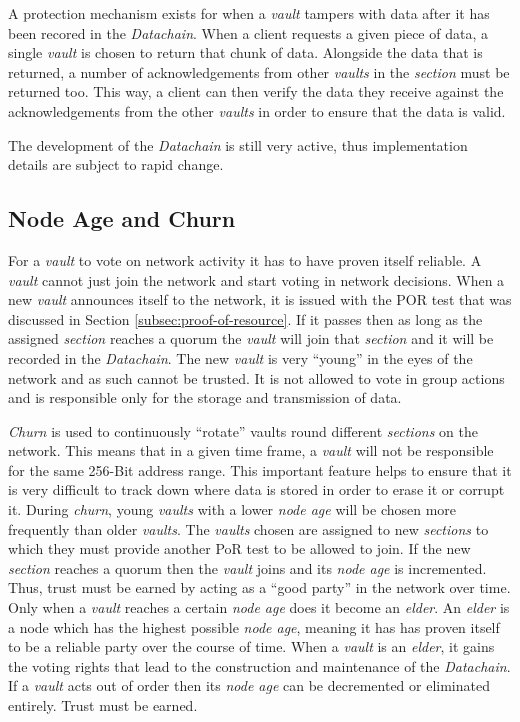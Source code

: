 A protection mechanism exists for when a \textit{vault} tampers with data after it has been recored in the \textit{Datachain}. When a client requests a given piece of data, a single \textit{vault} is chosen to return that chunk of data. Alongside the data that is returned, a number of acknowledgements from other \textit{vaults} in the \textit{section} must be returned too. This way, a client can then verify the data they receive against the acknowledgements from the other \textit{vaults} in order to ensure that the data is valid.

The development of the \textit{Datachain} is still very active, thus implementation details are subject to rapid change.

\subsection{Node Age and Churn}

For a \textit{vault} to vote on network activity it has to have proven itself reliable. A \textit{vault} cannot just join the network and start voting in network decisions. When a new \textit{vault} announces itself to the network, it is issued with the POR test that was discussed in Section \ref{subsec:proof-of-resource}. If it passes then as long as the assigned \textit{section} reaches a quorum the \textit{vault} will join that \textit{section} and it will be recorded in the \textit{Datachain}. The new \textit{vault} is very ``young'' in the eyes of the network and as such cannot be trusted. It is not allowed to vote in group actions and is responsible only for the storage and transmission of data.

\textit{Churn} is used to continuously ``rotate'' vaults round different \textit{sections} on the network. This means that in a given time frame, a \textit{vault} will not be responsible for the same 256-Bit address range. This important feature helps to ensure that it is very difficult to track down where data is stored in order to erase it or corrupt it. During \textit{churn}, young \textit{vaults} with a lower \textit{node age} will be chosen more frequently than older \textit{vaults}. The \textit{vaults} chosen are assigned to new \textit{sections} to which they must provide another PoR test to be allowed to join. If the new \textit{section} reaches a quorum then the \textit{vault} joins and its \textit{node age} is incremented. Thus, trust must be earned by acting as a ``good party'' in the network over time. Only when a \textit{vault} reaches a certain \textit{node age} does it become an \textit{elder}. An \textit{elder} is a node which has the highest possible \textit{node age}, meaning it has has proven itself to be a reliable party over the course of time. When a \textit{vault} is an \textit{elder}, it gains the voting rights that lead to the construction and maintenance of the \textit{Datachain}. If a \textit{vault} acts out of order then its \textit{node age} can be decremented or eliminated entirely. Trust must be earned.


